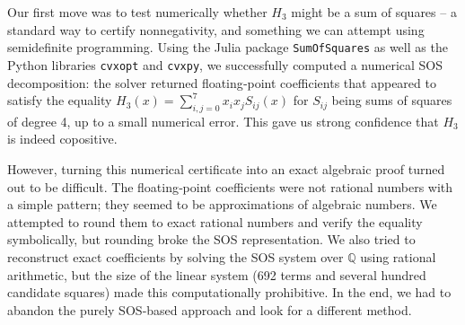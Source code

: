 \documentclass[11pt]{amsart}
\theoremstyle{definition}
\theoremstyle{remark}
\begin{document}
Our first move was to test numerically whether $H_3$ might be a sum of squares – a standard way to certify nonnegativity, and something we can attempt using semidefinite programming.
Using the Julia package \texttt{SumOfSquares} as well as the Python libraries \texttt{cvxopt} and \texttt{cvxpy}, we successfully computed a numerical SOS decomposition: the solver returned floating‑point coefficients that appeared to satisfy the equality $H_3(x)= \sum_{i,j=0}^7 x_ix_jS_{ij}(x)$ for
$S_{ij}$ being sums of squares of degree 4, up to a small numerical error. This gave us strong confidence that $H_3$ is indeed copositive.

However, turning this numerical certificate into an exact algebraic proof turned out to be difficult. The floating‑point coefficients were not rational numbers with a simple pattern; they seemed to be approximations of algebraic numbers. We attempted to round them to exact rational numbers and verify the equality symbolically, but rounding broke the SOS representation. We also tried to reconstruct exact coefficients by solving the SOS system over $\mathbb{Q}$ using rational arithmetic, but the size of the linear system (692 terms and several hundred candidate squares) made this computationally prohibitive. In the end, we had to abandon the purely SOS‑based approach and look for a different method.

%
%
\end{document}
